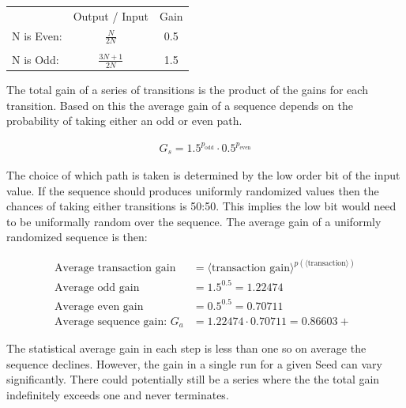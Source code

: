 \documentclass[letterpaper]{article}
\begin{document}
\begin{multicols}{2}
    \begin{center}
        \begin{tabular}{l c c}
                       & Output / Input      & Gain \\
            N is Even: & $\frac{N}{2N}$      & 0.5  \\
                       &                     &      \\
            N is Odd:  & $\frac{3N + 1}{2N}$ & 1.5
        \end{tabular}
    \end{center}

    The total gain of a series of transitions is the product of the gains for each transition. Based on this the average gain of a sequence depends on the probability of taking either an odd or even path.

    \begin{align*}
        G_s = 1.5^{p_{\text{odd}}} \cdot 0.5^{p_{\text{even}}}
    \end{align*}

    The choice of which path is taken is determined by the low order bit of the input value. If the sequence should produces uniformly randomized values then the chances of taking either transitions is 50:50. This implies the low bit would need to be uniformally random over the sequence. The average gain of a uniformly randomized sequence is then:

    \begin{align*}
        \text{Average transaction gain}    & = \langle \text{transaction gain} \rangle^{p(\langle \text{transaction} \rangle)} \\
        \text{Average odd gain}            & = 1.5^{0.5} = 1.22474                                                             \\
        \text{Average even gain}           & = 0.5^{0.5} = 0.70711                                                             \\
        \text{Average sequence gain: } G_a & = 1.22474 \cdot 0.70711 = 0.86603+
    \end{align*}

    The statistical average gain in each step is less than one so on average the sequence declines. However, the gain in a single run for a given Seed can vary significantly. There could potentially still be a series where the the total gain indefinitely exceeds one and never terminates.


\end{multicols}
\end{document}
